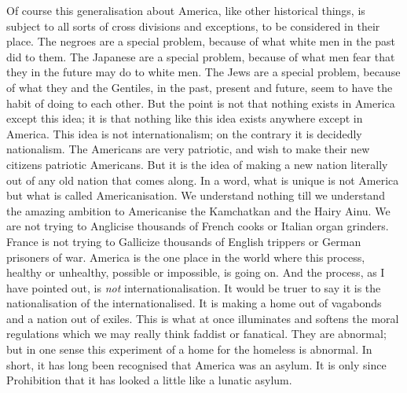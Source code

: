 \documentclass{book}
\begin{document}
Of course this generalisation about America, like other historical things, is subject to all sorts of cross divisions and exceptions, to be considered in their place. The negroes are a special problem, because of what white men in the past did to them. The Japanese are a special problem, because of what men fear that they in the future may do to white men. The Jews are a special problem, because of what they and the Gentiles, in the past, present and future, seem to have the habit of doing to each other. But the point is not that nothing exists in America except this idea; it is that nothing like this idea exists anywhere except in America. This idea is not internationalism; on the contrary it is decidedly nationalism. The Americans are very patriotic, and wish to make their new citizens patriotic Americans. But it is the idea of making a new nation literally out of any old nation that comes along. In a word, what is unique is not America but what is called Americanisation. We understand nothing till we understand the amazing ambition to Americanise the Kamchatkan and the Hairy Ainu. We are not trying to Anglicise thousands of French cooks or Italian organ grinders. France is not trying to Gallicize thousands of English trippers or German prisoners of war. America is the one place in the world where this process, healthy or unhealthy, possible or impossible, is going on. And the process, as I have pointed out, is \emph{not} internationalisation. It would be truer to say it is the nationalisation of the internationalised. It is making a home out of vagabonds and a nation out of exiles. This is what at once illuminates and softens the moral regulations which we may really think faddist or fanatical. They are abnormal; but in one sense this experiment of a home for the homeless is abnormal. In short, it has long been recognised that America was an asylum. It is only since Prohibition that it has looked a little like a lunatic asylum.
\end{document}
